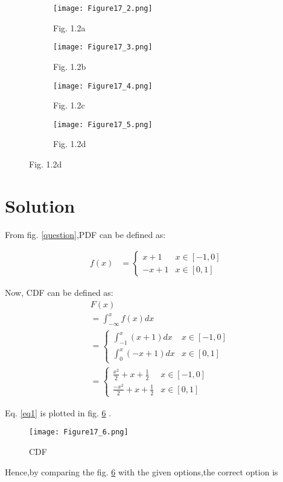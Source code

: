 \documentclass[journal,12pt,twocolumn]{IEEEtran}
\begin{document}
\begin{figure}
\captionsetup[subfigure]{labelformat=empty}
     \centering
     \begin{subfigure}[b]{0.5\columnwidth}
         \centering
         \texttt{[image: Figure17\_2.png]}
         \caption{Fig. 1.2a}
         \label{option1}
     \end{subfigure}
     \quad
     \begin{subfigure}[b]{0.5\columnwidth}
         \centering
         \texttt{[image: Figure17\_3.png]}
         \caption{Fig. 1.2b}
         \label{option2}
     \end{subfigure}
     \quad
     \begin{subfigure}[b]{0.5\columnwidth}
         \centering
         \texttt{[image: Figure17\_4.png]}
         \caption{Fig. 1.2c}
         \label{option3}
     \end{subfigure}
     \quad
     \begin{subfigure}[b]{0.5\columnwidth}
         \centering
         \texttt{[image: Figure17\_5.png]}
         \caption{Fig. 1.2d}
         \label{option4}
     \end{subfigure}
\end{figure}

\newpage
\section{Solution}

From fig. \ref{question},PDF can be defined as:

\begin{align}
f(x) &= 
\begin{cases}  
x+1 & x \in [-1,0] \\
-x+1 & x \in [0,1]
\end{cases}
\end{align}

Now, CDF can be defined as:
\begin{align}
    &F(x)  \\ &=\int_{-\infty}^{x}f(x)dx  \\
    &=
    \begin{cases} 
    \int_{-1}^{x}(x+1)dx & x \in [-1,0] \\
    \int_{0}^{x}(-x+1)dx & x \in [0,1]
    \end{cases}
    \\
    &=
    \begin{cases}  \label{eq1}
    \frac{x^2}{2}+x+\frac{1}{2} & x \in [-1,0] \\
    \frac{-x^2}{2}+x+\frac{1}{2} & x \in [0,1]
    \end{cases}
\end{align}

Eq. \eqref{eq1} is plotted in fig. \ref{CDF} .

\begin{figure}[!ht]
\centering
\texttt{[image: Figure17\_6.png]}
\caption{CDF}
\label{CDF}	
\end{figure}

Hence,by comparing the fig. \ref{CDF} with the given options,the correct option is 
\end{document}
